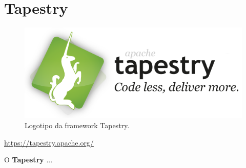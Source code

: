 \section{Tapestry}
\label{subsec:tapestry}

\begin{figure}[H]
    \centering
    \includegraphics[scale=0.25]{images/tapestry.png}
    \caption{Logotipo da framework Tapestry.}
    \label{fig:tapestry}
\end{figure}

\href{https://tapestry.apache.org/}{https://tapestry.apache.org/}

\hspace{5mm} O \textbf{Tapestry} ...
